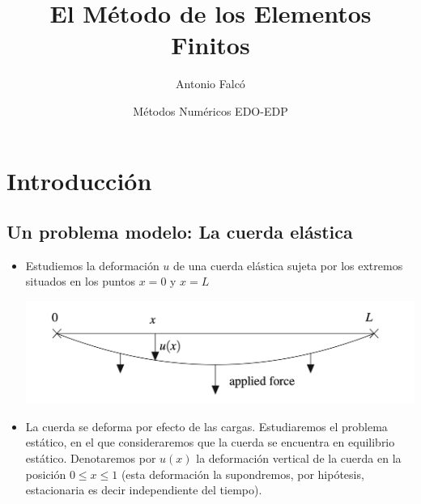\documentclass[10pt,handout]{beamer}
\title{El Método de los Elementos Finitos}
\author{Antonio Falcó}
\date{Métodos Numéricos EDO-EDP}
\theoremstyle{plain} %
\theoremstyle{plain} %
\theoremstyle{plain} %
\theoremstyle{plain} %
\theoremstyle{definition}
\theoremstyle{example}
\theoremstyle{example}
\theoremstyle{remark}
\theoremstyle{remark}
\begin{document}
\begin{frame}
\maketitle
\end{frame}

\begin{frame}
  \tableofcontents
\end{frame}

\section{Introducción}

\subsection{Un problema modelo: La cuerda elástica}

\begin{frame}
\begin{itemize}
\item Estudiemos la deformación $u$ de una cuerda elástica sujeta por los extremos situados
en los puntos $x=0$ y $x=L$
\begin{center}
\includegraphics[scale=0.3]{./figure1.png}
\end{center}
\item La cuerda se deforma por efecto de las cargas. Estudiaremos el problema estático, en el que consideraremos 
que la cuerda se encuentra en equilibrio estático. Denotaremos por $u(x)$ la deformación vertical de 
la cuerda en la posición $0 \le x \le 1$ (esta deformación la supondremos, por hipótesis, estacionaria es decir independiente del tiempo).
\end{itemize}
\end{frame}
\end{document}
